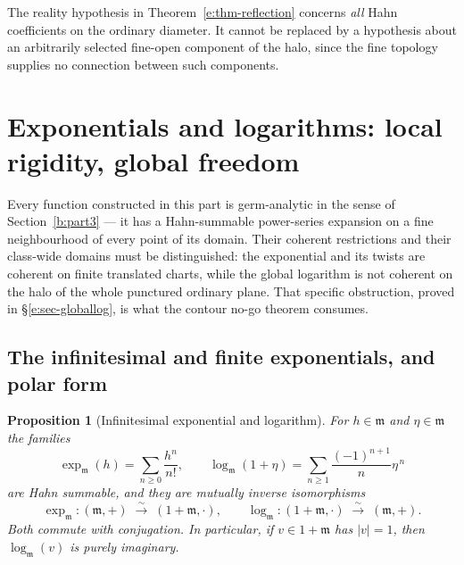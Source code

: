 \documentclass[11pt,a4paper]{article}
\numberwithin{equation}{section}
\newtheorem{proposition}[theorem]{Proposition}
\theoremstyle{definition}
\theoremstyle{remark}
\theoremstyle{plain}
\newcommand{\mm}{\mathfrak m}
\newcommand{\abs}[1]{\lvert #1\rvert}
\begin{document}
The reality hypothesis in Theorem~\ref{e:thm-reflection} concerns
\emph{all} Hahn coefficients on the ordinary diameter.  It cannot be
replaced by a hypothesis about an arbitrarily selected fine-open component
of the halo, since the fine topology supplies no connection between such
components.


\section{Exponentials and logarithms: local rigidity, global freedom}
\label{e:p9}

Every function constructed in this part is germ-analytic in the sense of
Section~\ref{b:part3} --- it has a Hahn-summable power-series expansion on a fine
neighbourhood of every point of its domain. Their coherent restrictions
and their class-wide domains must be distinguished: the exponential
and its twists are coherent on finite translated charts, while the
global logarithm is not coherent on the halo of the whole punctured
ordinary plane. That specific obstruction, proved in
\S\ref{e:sec-globallog}, is what the contour no-go theorem consumes.

\subsection{The infinitesimal and finite exponentials, and polar form}
\label{e:sec-infexp}

\begin{proposition}[Infinitesimal exponential and logarithm]
\label{e:prop-infexp}
For $h\in\mm$ and $\eta\in\mm$ the families
\[
 \exp_{\mm}(h)=\sum_{n\ge0}\frac{h^n}{n!},
 \qquad
 \log_{\mm}(1+\eta)=\sum_{n\ge1}\frac{(-1)^{n+1}}{n}\eta^{\,n}
\]
are Hahn summable, and they are mutually inverse isomorphisms
\[
 \exp_{\mm}:(\mm,+)\;\xrightarrow{\ \sim\ }\;(1+\mm,\cdot),
 \qquad
 \log_{\mm}:(1+\mm,\cdot)\;\xrightarrow{\ \sim\ }\;(\mm,+).
\]
Both commute with conjugation.  In particular, if $v\in1+\mm$ has
$\abs v=1$, then $\log_{\mm}(v)$ is purely imaginary.
\end{proposition}
\end{document}
